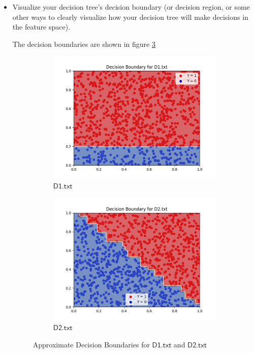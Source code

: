 \documentclass[a4paper]{article}
\theoremstyle{definition}
\newenvironment{soln}{
    \leavevmode\color{blue}\ignorespaces
}{}
\begin{document}
\begin{enumerate}
\begin{itemize}
  \item Visualize your decision tree's decision boundary (or decision region, or some other ways to clearly visualize how your decision tree will make decisions in the feature space).

  \begin{soln}
      The decision boundaries are shown in figure \ref{fig:5}

      \begin{figure}[h]
          \centering
          \begin{subfigure}{0.5\textwidth}
          \centering
          \includegraphics[width=1.1\linewidth]{Decision_Boundary_D1.png}
          \caption{$\mathsf{D1.txt}$}
          \label{fig:5sub1}
        \end{subfigure}%
        \begin{subfigure}{0.5\textwidth}
          \centering
          \includegraphics[width=1.1\linewidth]{Decision_Boundary_D2.png}
          \caption{$\mathsf{D2.txt}$}
          \label{fig:5sub2}
          \end{subfigure}
          \caption{Approximate Decision Boundaries for $\mathsf{D1.txt}$ and $\mathsf{D2.txt}$}
          \label{fig:5}
      \end{figure}
  \end{soln}


\end{itemize}
\end{enumerate}
\end{document}
